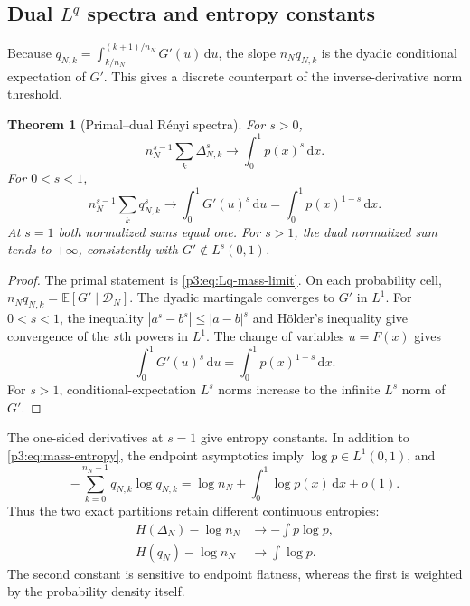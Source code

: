\documentclass[11pt]{article}
\newtheorem{theorem}{Theorem}[section]
\theoremstyle{definition}
\theoremstyle{remark}
\newcommand{\E}{\mathbb E}
\newcommand{\dd}{\,\mathrm d}
\begin{document}
\subsection{Dual $L^q$ spectra and entropy constants}

Because $q_{N,k}=\int_{k/n_N}^{(k+1)/n_N}G'(u)\dd u$, the slope
$n_Nq_{N,k}$ is the dyadic conditional expectation of $G'$.  This gives a
discrete counterpart of the inverse-derivative norm threshold.

\begin{theorem}[Primal--dual R\'enyi spectra]
\label{p3:thm:dual-Renyi}
For $s>0$,
\begin{equation}\label{p3:eq:primal-Renyi}
 n_N^{s-1}\sum_k\Delta_{N,k}^s
 \longrightarrow\int_0^1p(x)^s\dd x.
\end{equation}
For $0<s<1$,
\begin{equation}\label{p3:eq:dual-Renyi}
 n_N^{s-1}\sum_kq_{N,k}^s
 \longrightarrow\int_0^1G'(u)^s\dd u
 =\int_0^1p(x)^{1-s}\dd x.
\end{equation}
At $s=1$ both normalized sums equal one.  For $s>1$, the dual normalized
sum tends to $+\infty$, consistently with $G'\notin L^s(0,1)$.
\end{theorem}

\begin{proof}
The primal statement is \eqref{p3:eq:Lq-mass-limit}.  On each probability cell,
$n_Nq_{N,k}=\E[G'\mid\mathcal D_N]$.  The dyadic martingale converges to $G'$
in $L^1$.  For $0<s<1$, the inequality
$|a^s-b^s|\le|a-b|^s$ and H\"older's inequality give convergence of the
$s$th powers in $L^1$.  The change of variables $u=F(x)$ gives
\[
 \int_0^1G'(u)^s\dd u
 =\int_0^1p(x)^{1-s}\dd x.
\]
For $s>1$, conditional-expectation $L^s$ norms increase to the infinite
$L^s$ norm of $G'$.
\end{proof}

The one-sided derivatives at $s=1$ give entropy constants.  In addition to
\eqref{p3:eq:mass-entropy}, the endpoint asymptotics imply $\log p\in L^1(0,1)$,
and
\begin{equation}\label{p3:eq:quantile-entropy}
 -\sum_{k=0}^{n_N-1}q_{N,k}\log q_{N,k}
 =\log n_N+\int_0^1\log p(x)\dd x+o(1).
\end{equation}
Thus the two exact partitions retain different continuous entropies:
\begin{align}
 H(\Delta_N)-\log n_N&\longrightarrow-\int p\log p,
 \label{p3:eq:entropy-primal-constant}\\
 H(q_N)-\log n_N&\longrightarrow\int\log p.
 \label{p3:eq:entropy-dual-constant}
\end{align}
The second constant is sensitive to endpoint flatness, whereas the first is
weighted by the probability density itself.
\end{document}
